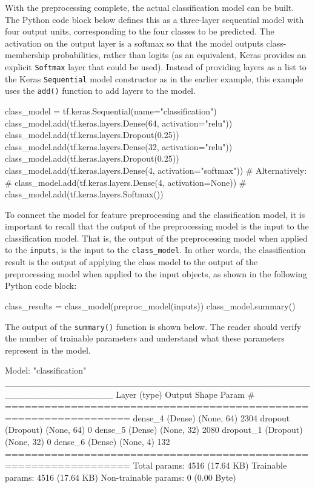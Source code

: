 With the preprocessing complete, the actual classification model can be built. The Python code block below defines this as a three-layer sequential model with four output units, corresponding to the four classes to be predicted. The activation on the output layer is a softmax so that the model outputs class-membership probabilities, rather than logits (as an equivalent, Keras provides an explicit \texttt{Softmax} layer that could be used). Instead of providing layers as a list to the Keras \texttt{Sequential} model constructor as in the earlier example, this example uses the \texttt{add()} function to add layers to the model.

\begin{pythoncode}
class_model = tf.keras.Sequential(name="classification")
class_model.add(tf.keras.layers.Dense(64, activation="relu"))
class_model.add(tf.keras.layers.Dropout(0.25))
class_model.add(tf.keras.layers.Dense(32, activation="relu"))
class_model.add(tf.keras.layers.Dropout(0.25))
class_model.add(tf.keras.layers.Dense(4, activation="softmax"))
# Alternatively:
# class_model.add(tf.keras.layers.Dense(4, activation=None))
# class_model.add(tf.keras.layers.Softmax())
\end{pythoncode}

To connect the model for feature preprocessing and the classification model, it is important to recall that the output of the preprocessing model is the input to the classification model. That is, the output of the preprocessing model when applied to the \texttt{inputs}, is the input to the \texttt{class\_model}. In other words, the classification result is the output of applying the class model to the output of the preprocessing model when applied to the input objects, as shown in the following Python code block:

\begin{pythoncode}
class_results = class_model(preproc_model(inputs))
class_model.summary()
\end{pythoncode}

The output of the \texttt{summary()} function is shown below. The reader should verify the number of trainable parameters and understand what these parameters represent in the model.

\begin{textcode}
Model: "classification"
_________________________________________________________________
 Layer (type)                Output Shape              Param #   
=================================================================
 dense_4 (Dense)             (None, 64)                2304      
 dropout (Dropout)           (None, 64)                0         
 dense_5 (Dense)             (None, 32)                2080      
 dropout_1 (Dropout)         (None, 32)                0         
 dense_6 (Dense)             (None, 4)                 132       
=================================================================
Total params: 4516 (17.64 KB)
Trainable params: 4516 (17.64 KB)
Non-trainable params: 0 (0.00 Byte)
\end{textcode}

